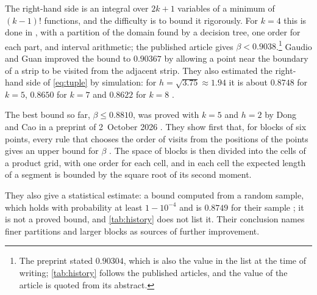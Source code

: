 The right-hand side is an integral over $2k+1$ variables of a minimum of $(k-1)!$ functions, and the difficulty is to bound it rigorously. For $k=4$ this is done in \cite{YuCarlsson2023}, with a partition of the domain found by a decision tree, one order for each part, and interval arithmetic; the published article \cite{CarlssonYu2026} gives $\beta<0.9038$.\footnote{The preprint \cite{YuCarlsson2023} stated $0.90304$, which is also the value in the list \cite{optimisation-constants-repo} at the time of writing; \cref{tab:history} follows the published articles, and the value of the article is quoted from its abstract.} Gaudio and Guan \cite{GaudioGuan2026} improved the bound to $0.90367$ by allowing a point near the boundary of a strip to be visited from the adjacent strip. They also estimated the right-hand side of \eqref{eq:tuple} by simulation: for $h=\sqrt{3.75}\approx1.94$ it is about $0.8748$ for $k=5$, $0.8650$ for $k=7$ and $0.8622$ for $k=8$ \cite[Table~2]{GaudioGuan2026}.

The best bound so far, $\beta\le0.8810$, was proved with $k=5$ and $h=2$ by Dong and Cao in a preprint of 2~October 2026 \cite{DongCao2026}. They show first that, for blocks of six points, every rule that chooses the order of visits from the positions of the points gives an upper bound for $\beta$ \cite[Theorem~4]{DongCao2026}. The space of blocks is then divided into the cells of a product grid, with one order for each cell, and in each cell the expected length of a segment is bounded by the square root of its second moment.

They also give a statistical estimate: a bound computed from a random sample, which holds with probability at least $1-10^{-4}$ and is $0.8749$ for their sample \cite[Section~4.3]{DongCao2026}; it is not a proved bound, and \cref{tab:history} does not list it. Their conclusion names finer partitions and larger blocks as sources of further improvement.

